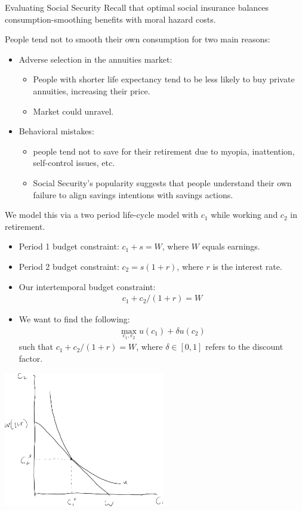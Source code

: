 \documentclass[8pt]{extarticle}
\begin{document}
  \begin{problem}{Evaluating Social Security}
    Recall that optimal social insurance balances consumption-smoothing benefits with moral hazard costs.\newline

    People tend not to smooth their own consumption for two main reasons:
    \begin{itemize}
      \item Adverse selection in the annuities market:
        \begin{itemize}
          \item People with shorter life expectancy tend to be less likely to buy private annuities, increasing their price.
          \item Market could unravel.
        \end{itemize}
      \item Behavioral mistakes:
        \begin{itemize}
          \item people tend not to save for their retirement due to myopia, inattention, self-control issues, etc.
          \item Social Security's popularity suggests that people understand their own failure to align savings intentions with savings actions.
        \end{itemize}
    \end{itemize}
    We model this via a two period life-cycle model with $c_1$ while working and $c_2$ in retirement.
    \begin{itemize}
      \item Period 1 budget constraint: $c_1 + s = W$, where $W$ equals earnings.
      \item Period 2 budget constraint: $c_2 = s(1+r)$, where $r$ is the interest rate.
      \item Our intertemporal budget constraint:
        \begin{align*}
          c_1 + c_2/(1+r) = W
        \end{align*}
      \item We want to find the following:
        \begin{align*}
          \max_{c_1,c_2}u(c_1) + \delta u(c_2)
        \end{align*}
        such that $c_1 + c_2/(1+r) = W$, where $\delta\in[0,1]$ refers to the discount factor.
    \end{itemize}
    \begin{center}
      \includegraphics[width=7cm]{images/utility_max_retirement.png}

\end{center}
\end{problem}
\end{document}

